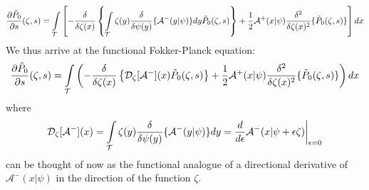 \begin{equation*}
\frac{\partial \Tilde{P}_{0}}{\partial s}(\zeta,s) = \int\limits_{\mathcal{T}}\left[-\frac{\delta}{\delta \zeta(x)}\left\{\int\limits_{\mathcal{T}}\zeta(y)\frac{\delta}{\delta \psi(y)}\{\mathcal{A}^{-}(y|\psi)\}dy\Tilde{P}_{0}(\zeta,s)\right\}+\frac{1}{2}\mathcal{A}^{+}(x|\psi)\frac{\delta^2}{\delta\zeta(x)^2}\{\Tilde{P}_{0}(\zeta,s)\}\right]dx
\end{equation*}
We thus arrive at the functional Fokker-Planck equation:
\begin{equation}
\label{functional_WNE_zeroth_order}
    \frac{\partial \Tilde{P}_{0}}{\partial s}(\zeta,s) = \int\limits_{\mathcal{T}}\left(-\frac{\delta}{\delta \zeta(x)}\left\{\mathcal{D}_{\zeta}[\mathcal{A}^{-}](x)\Tilde{P}_{0}(\zeta,s)\right\}+\frac{1}{2}\mathcal{A}^{+}(x|\psi)\frac{\delta^2}{\delta\zeta(x)^2}\{\Tilde{P}_{0}(\zeta,s)\}\right)dx
\end{equation}
where 
\begin{equation*}
\mathcal{D}_{\zeta}[\mathcal{A}^{-}](x) = \int\limits_{\mathcal{T}}\zeta(y)\frac{\delta}{\delta \psi(y)}\{\mathcal{A}^{-}(y|\psi)\}dy = \frac{d}{d\epsilon}\mathcal{A}^-(x|\psi + \epsilon \zeta) \bigg{|}_{\epsilon = 0}
\end{equation*}
can be thought of now as the functional analogue of a directional derivative of $\mathcal{A}^-(x|\psi)$ in the direction of the function $\zeta$.